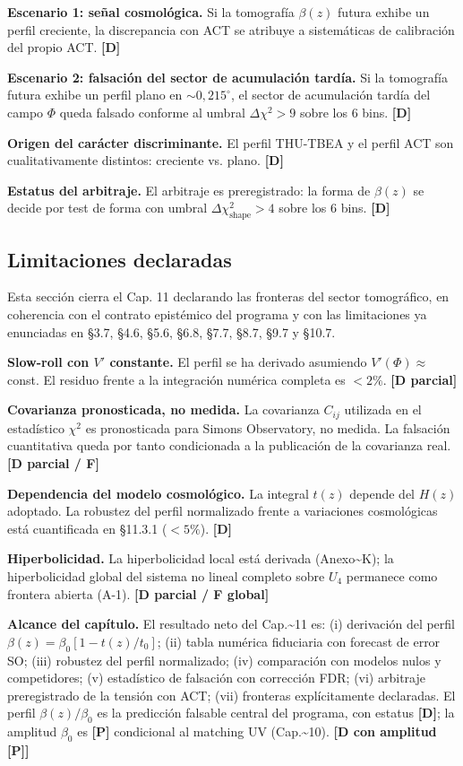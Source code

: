 ﻿\documentclass[11pt,letterpaper]{article}
\begin{document}
\textbf{Escenario 1: señal cosmológica.} Si la tomografía $\beta(z)$ futura exhibe un perfil creciente, la discrepancia con ACT se atribuye a sistemáticas de calibración del propio ACT. \textbf{[D]}

\textbf{Escenario 2: falsación del sector de acumulación tardía.} Si la tomografía futura exhibe un perfil plano en $\sim 0{,}215^\circ$, el sector de acumulación tardía del campo $\Phi$ queda falsado conforme al umbral $\Delta\chi^2 > 9$ sobre los $6$ bins. \textbf{[D]}

\textbf{Origen del carácter discriminante.} El perfil THU-TBEA y el perfil ACT son cualitativamente distintos: creciente vs. plano. \textbf{[D]}

\textbf{Estatus del arbitraje.} El arbitraje es preregistrado: la forma de $\beta(z)$ se decide por test de forma con umbral $\Delta\chi^2_{\text{shape}} > 4$ sobre los $6$ bins. \textbf{[D]}
\subsection{Limitaciones declaradas}
Esta sección cierra el Cap. 11 declarando las fronteras del sector tomográfico, en coherencia con el contrato epistémico del programa y con las limitaciones ya enunciadas en §3.7, §4.6, §5.6, §6.8, §7.7, §8.7, §9.7 y §10.7.

\textbf{Slow-roll con $V'$ constante.} El perfil se ha derivado asumiendo $V'(\Phi) \approx$ const. El residuo frente a la integración numérica completa es $< 2\%$. \textbf{[D parcial]}

\textbf{Covarianza pronosticada, no medida.} La covarianza $C_{ij}$ utilizada en el estadístico $\chi^2$ es pronosticada para Simons Observatory, no medida. La falsación cuantitativa queda por tanto condicionada a la publicación de la covarianza real. \textbf{[D parcial / F]}

\textbf{Dependencia del modelo cosmológico.} La integral $t(z)$ depende del $H(z)$ adoptado. La robustez del perfil normalizado frente a variaciones cosmológicas está cuantificada en §11.3.1 ($< 5\%$). \textbf{[D]}

\textbf{Hiperbolicidad.} La hiperbolicidad local está derivada (Anexo\textasciitilde{}K); la hiperbolicidad global del sistema no lineal completo sobre $U_4$ permanece como frontera abierta (A-1). \textbf{[D parcial / F global]}

\textbf{Alcance del capítulo.} El resultado neto del Cap.\textasciitilde{}11 es: (i) derivación del perfil $\beta(z) = \beta_0[1 - t(z)/t_0]$; (ii) tabla numérica fiduciaria con forecast de error SO; (iii) robustez del perfil normalizado; (iv) comparación con modelos nulos y competidores; (v) estadístico de falsación con corrección FDR; (vi) arbitraje preregistrado de la tensión con ACT; (vii) fronteras explícitamente declaradas. El perfil $\beta(z)/\beta_0$ es la predicción falsable central del programa, con estatus \textbf{[D]}; la amplitud $\beta_0$ es \textbf{[P]} condicional al matching UV (Cap.\textasciitilde{}10). \textbf{[D con amplitud [P]]}
\end{document}
